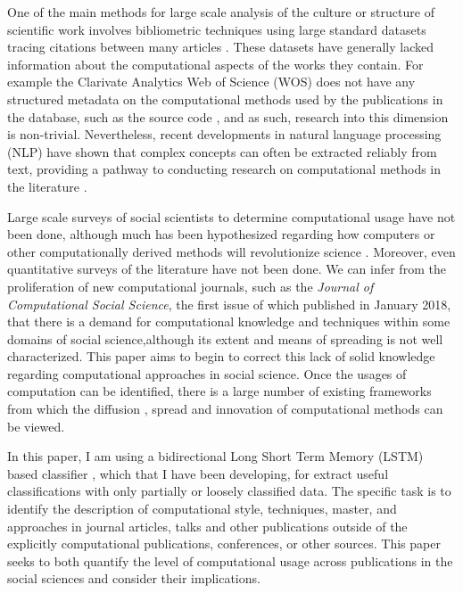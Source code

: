 \documentclass[12pt, a4paper]{article}
\begin{document}
One of the main methods for large scale analysis of the culture or structure of scientific work involves bibliometric techniques \citep{de2009bibliometrics} using large standard datasets tracing citations  between many articles \citep[e.g.][]{Boyack2005, borner2010atlas, borner2015atlas, sugimoto2013global, shi2015weaving, evans_meta, skupin2013visualizing}. These datasets have generally lacked information about the computational aspects of the works they contain. For  example the  Clarivate Analytics Web of Science (WOS) does not have any structured  metadata on the computational methods used by the publications in the database, such as the source code \citep{mkdocs}, and as such, research into this dimension is non-trivial. Nevertheless, recent developments in natural language processing (NLP) have shown that complex concepts can often be extracted reliably from text, providing a pathway to conducting research on computational methods in the literature \citep{evans2016machine} \citep{foster2015tradition}.

Large scale surveys of social scientists to determine computational usage have not been done, although much has been hypothesized regarding how computers or other computationally derived methods will revolutionize science \citep[e.g.][]{de1997computer, anderson2008end,  provost2013data, john2014big}. Moreover,  even quantitative  surveys  of  the  literature  have  not been  done. We can infer from the proliferation of new computational journals, such as the \textit{Journal of Computational Social Science}, the first issue of which published in January 2018, that there is a demand for computational knowledge and techniques within some  domains  of  social science,although its extent and means of spreading is not well characterized. This paper aims to begin to correct this lack of solid knowledge regarding computational approaches in social  science.  Once the usages of computation can be identified, there is a large number of existing frameworks from which the diffusion \citep{griliches1960hybrid}, spread \citep{padgett1993robust} and innovation \citep{foster2015tradition} of computational methods can be viewed.

In this paper, I am using a bidirectional Long Short Term Memory (LSTM) based classifier \cite{graves2005framewise}, which that I have been developing, for extract useful classifications with only partially or loosely classified data. The specific task is to identify the description of computational style, techniques, master, and approaches in journal articles, talks and other publications outside of the explicitly computational publications, conferences, or other sources. This paper seeks to both quantify the level of computational usage across publications in the social sciences and consider their implications.
\end{document}
